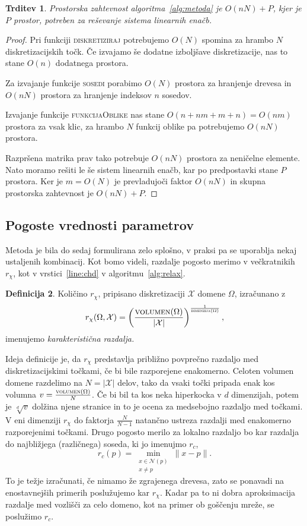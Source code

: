 \documentclass[12pt,a4paper,twoside]{article}
\theoremstyle{definition} %
\newtheorem{definicija}{Definicija}[section]
\theoremstyle{plain} %
\newtheorem{trditev}[definicija]{Trditev}
\numberwithin{equation}{section}
\newcommand{\Nc}{\mathcal{N}}
\newcommand{\X}{\mathcal{X}}
\begin{document}
\begin{trditev}
  Prostorska zahtevnost algoritma~\ref{alg:metoda} je $O(nN) + P$, kjer je $P$
  prostor, potreben za reševanje sistema linearnih enačb.
\end{trditev}
\begin{proof}
Pri funkciji \textsc{diskretiziraj} potrebujemo $O(N)$ spomina za hrambo $N$
diskretizacijskih točk. Če izvajamo še dodatne izboljšave diskretizacije, nas to
stane $O(n)$ dodatnega prostora.

Za izvajanje funkcije \textsc{sosedi} porabimo $O(N)$ prostora za hranjenje drevesa
in $O(nN)$ prostora za hranjenje indeksov $n$ sosedov.

Izvajanje funkcije \textsc{funkcijaOblike} nas stane $O(n+nm+m+n) = O(nm)$
prostora za vsak klic, za hrambo $N$ funkcij oblike pa potrebujemo $O(nN)$
prostora.

Razpršena matrika prav tako potrebuje $O(nN)$ prostora za neničelne elemente.
Nato moramo rešiti le še sistem linearnih enačb, kar po predpostavki stane $P$
prostora. Ker je $m = O(N)$ je prevladujoči faktor $O(nN)$ in skupna prostorska
zahtevnost je $O(nN) + P$.
\end{proof}

\subsection{Pogoste vrednosti parametrov}
Metoda je bila do sedaj formulirana zelo splošno, v praksi pa se uporablja nekaj
ustaljenih kombinacij. Kot bomo videli, razdalje pogosto merimo v večkratnikih
$r_\chi$, kot v vrstici~\ref{line:chd} v algoritmu~\ref{alg:relax}.
\begin{definicija}
  Količino $r_\chi$, pripisano diskretizaciji $\X$ domene $\Omega$, izračunano z
  \begin{equation}
    r_\chi(\Omega, \X) = \left( \frac{\textsc{volumen}(\Omega)}{|\X|}
    \right)^\frac{1}{\textsc{dimenzija}(\Omega)},
  \end{equation}
  imenujemo \emph{karakteristična razdalja.}
\end{definicija}
Ideja definicije je, da $r_\chi$ predstavlja približno povprečno razdaljo med
diskretizacijskimi točkami, če bi bile razporejene enakomerno. Celoten volumen
domene razdelimo na $N = |\X|$ delov, tako da vsaki točki pripada enak kos
volumna $v = \frac{\textsc{volumen}(\Omega)}{N}$. Če bi
bil ta kos neka hiperkocka v $d$ dimenzijah, potem je $\sqrt[d]{v}$ dolžina
njene stranice in to je ocena za medsebojno razdaljo med točkami.
V eni dimenziji $r_\chi$ do faktorja $\frac{N}{N-1}$ natančno ustreza razdalji
med enakomerno razporejenimi točkami.
Drugo pogosto merilo za lokalno razdaljo bo kar razdalja do najbližjega
(različnega) soseda, ki jo imenujmo $r_c$,
\begin{equation}
  r_c(p) = \min_{\substack{x \in \Nc(p) \\ x \neq p}} \|x-p\|.
  \label{eq:min-dist}
\end{equation}
To je težje izračunati, če nimamo že
zgrajenega drevesa, zato se ponavadi na enostavnejših primerih poslužujemo kar
$r_\chi$. Kadar pa to ni dobra aproksimacija razdalje med vozlišči za celo
domeno, kot na primer ob goščenju mreže, se poslužimo $r_c$.
\end{document}
